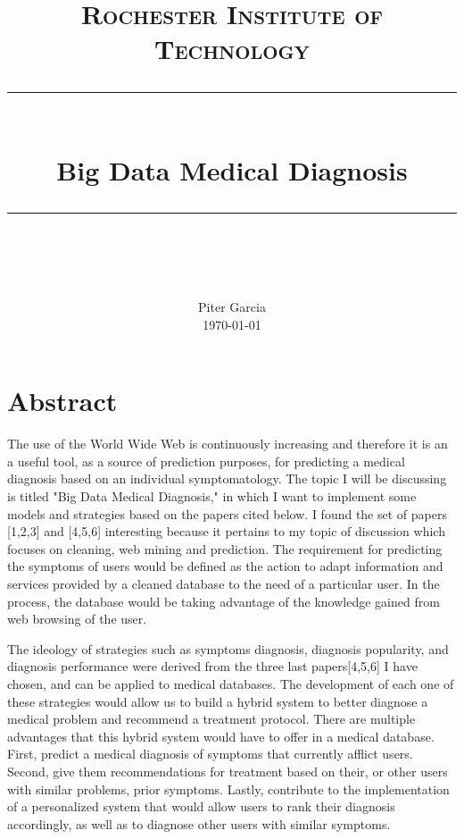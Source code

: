 \documentclass[sts]{sig-alternate}
\begin{document}
\newcommand{\horrule}[1]{\rule{\linewidth}{#1}} 	%

\title{
		\textbf{\normalfont\normalsize\textsc{Rochester Institute of Technology}} \\
		\horrule{0.5pt} \\[0.4cm]
		\textbf{\huge Big Data Medical Diagnosis} \\
		\horrule{2pt} \\[0.5cm]
		\vspace{-10mm}
}

\author{
		\normalfont\Large 
        Piter Garcia\\[0pt]\normalsize
        \today
}
\date{}
\maketitle


\section{Abstract}
	\label{Abstract}

	The use of the World Wide Web is continuously increasing and therefore it is an a useful tool, as a 		source of prediction purposes, for predicting a medical diagnosis based on an individual 					symptomatology. The topic I will be discussing is titled "Big Data Medical Diagnosis," in which I 		want to implement some models and strategies based on the papers cited below. I found the set of 			papers [1,2,3] and [4,5,6] interesting because it pertains to my topic of discussion which focuses 		on 	cleaning, web mining and prediction. The requirement for predicting the symptoms of users 			would be defined as the action to adapt information and services provided by a cleaned database to 		the need of a particular user. In the process, the database would be taking advantage of the 				knowledge gained from web browsing of the user.
	
	The ideology of strategies such as symptoms diagnosis, diagnosis popularity, and diagnosis 				performance were derived from the three last papers[4,5,6] I have chosen, and can be applied to 			medical databases. The development of each one of these strategies would 	allow us to build a hybrid 	system to better diagnose a medical problem and recommend a treatment protocol. There are multiple 		advantages that this hybrid system would have to offer in a medical database. First, predict a 			medical diagnosis of symptoms that currently afflict users. Second, give 	them recommendations for 		treatment based on their, or other users with similar problems, prior symptoms. Lastly, contribute 		to the implementation of a personalized system that would allow users to rank their diagnosis 			accordingly, as well as to diagnose other users with similar symptoms. 
	
\end{document}
